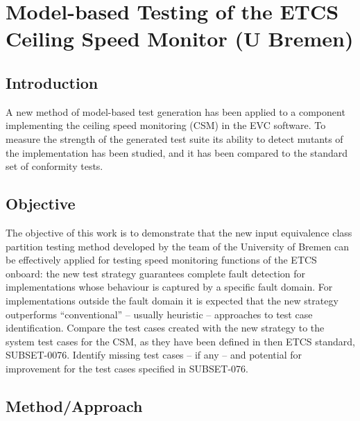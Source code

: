 

\chapter{Model-based Testing  of the ETCS Ceiling Speed Monitor (U Bremen)}
\label{sec:csmunibremen}

\section{Introduction}
 
A new method of model-based test generation has been applied to a
component implementing the ceiling speed monitoring (CSM) in the EVC
software. To measure the strength of the generated test suite
its ability to detect mutants of the implementation has been studied,
and it has been compared to the standard set of conformity tests.


\section{Objective}

The objective of this work is to demonstrate that the new input equivalence class partition testing method
developed by the team of the University of Bremen can be effectively applied for 
testing speed monitoring functions of the ETCS onboard: the new test strategy 
guarantees complete fault detection for implementations whose behaviour is captured
by a specific fault domain. For implementations outside the fault domain it is expected that the new strategy outperforms ``conventional'' -- usually heuristic -- approaches to test case identification. Compare the test cases created with the new strategy to
the system test cases for the CSM, as they have been defined in then ETCS standard,
SUBSET-0076. Identify missing test cases -- if any -- and potential for improvement for 
the test cases specified in SUBSET-076.


\section{Method/Approach}

